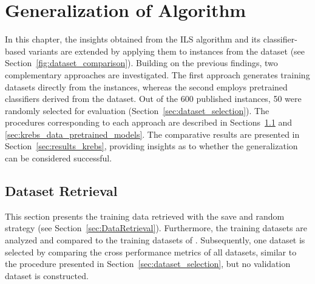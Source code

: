 
\chapter{Generalization of Algorithm}
\label{chap:application_krebs}


In this chapter, the insights obtained from the \gls{ILS} algorithm and its classifier-based variants are extended by
applying them to instances from the \krebsADataSetText dataset (see Section~\ref{fig:dataset_comparison}). Building on
the previous findings, two complementary approaches are investigated. The first approach generates training datasets
directly from the \krebsADataSetText instances, whereas the second employs pretrained classifiers derived from the
\gendreauDataSetText dataset.
Out of the 600 published instances, 50 were randomly selected for evaluation (Section~\ref{sec:dataset_selection}).
The procedures corresponding to each approach are described in Sections~\ref{sec:krebs_data_retrieval} and
\ref{sec:krebs_data_pretrained_models}. The comparative results are presented in Section~\ref{sec:results_krebs},
providing insights as to whether the generalization can be considered successful.


\section{Dataset Retrieval}
\label{sec:krebs_data_retrieval}

This section presents the training data retrieved with the save and random strategy (see Section~\ref{sec:DataRetrieval}). Furthermore,
the training datasets are analyzed and compared to the training datasets of \gendreauDataSet. Subsequently, one dataset is selected by
comparing the cross performance metrics of all datasets, similar to the procedure presented in Section~\ref{sec:dataset_selection}, but no
validation dataset is constructed.

